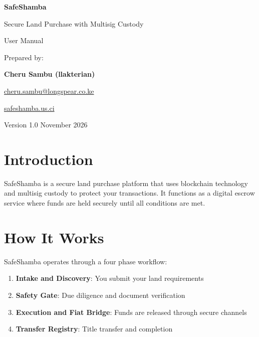 \documentclass[11pt]{article}
\begin{document}
\begin{titlepage}
\centering
\vspace*{3cm}
{\Huge\bfseries\color{sambagreen} SafeShamba\par}
\vspace{0.5cm}
{\Large\color{sambagray} Secure Land Purchase with Multisig Custody\par}
\vspace{3cm}
{\LARGE User Manual\par}
\vspace{4cm}
{\large Prepared by:\par}
\vspace{0.3cm}
{\large\bfseries Cheru Sambu (llakterian)\par}
{\large \href{mailto:cheru.sambu@longspear.co.ke}{cheru.sambu@longspear.co.ke}\par}
{\large \href{https://safeshamba.us.ci}{safeshamba.us.ci}\par}
\vspace{2cm}
{\large Version 1.0 \textbar{} November 2026\par}
\end{titlepage}

\newpage
\tableofcontents
\newpage

\section{Introduction}
SafeShamba is a secure land purchase platform that uses blockchain technology and multisig custody to protect your transactions. It functions as a digital escrow service where funds are held securely until all conditions are met.

\section{How It Works}
SafeShamba operates through a four phase workflow:

\begin{enumerate}
\item \textbf{Intake and Discovery}: You submit your land requirements
\item \textbf{Safety Gate}: Due diligence and document verification
\item \textbf{Execution and Fiat Bridge}: Funds are released through secure channels
\item \textbf{Transfer Registry}: Title transfer and completion
\end{enumerate}
\end{document}
